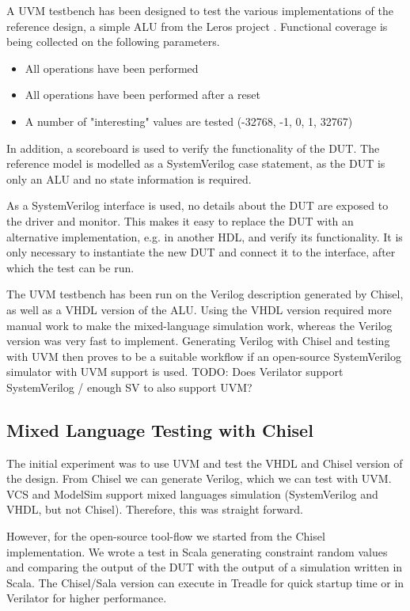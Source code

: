 \documentclass[conference]{IEEEtran}
\newcommand{\todo}[1]{{\color{olive} TODO: #1}}
\begin{document}
A UVM testbench has been designed to test the various implementations of the reference design, a simple ALU from the Leros project \cite{leros:fpl2011}. Functional coverage is being collected on the following parameters.
\begin{itemize}
    \item All operations have been performed
    \item All operations have been performed after a reset
    \item A number of "interesting" values are tested (-32768, -1, 0, 1, 32767)
\end{itemize}

In addition, a scoreboard is used to verify the functionality of the DUT. The reference model is modelled as a SystemVerilog case statement, as the DUT is only an ALU and no state information is required.

As a SystemVerilog interface is used, no details about the DUT are exposed to the driver and monitor. This makes it easy to replace the DUT with an alternative implementation, e.g. in another HDL, and verify its functionality. It is only necessary to instantiate the new DUT and connect it to the interface, after which the test can be run.

The UVM testbench has been run on the Verilog description generated by Chisel, as well as a VHDL version of the ALU. Using the VHDL version required more manual work to make the mixed-language simulation work, whereas the Verilog version was very fast to implement. Generating Verilog with Chisel and testing with UVM then proves to be a suitable workflow if an open-source SystemVerilog simulator with UVM support is used. \todo{Does Verilator support SystemVerilog / enough SV to also support UVM?}


\subsection{Mixed Language Testing with Chisel}


The initial experiment was to use UVM and test the VHDL and Chisel version of the
design. From Chisel we can generate Verilog, which we can test with UVM.
VCS and ModelSim support mixed languages simulation (SystemVerilog and VHDL,
but not Chisel). Therefore, this was straight forward.

However, for the open-source tool-flow we started from the Chisel implementation.
We wrote a test in Scala generating constraint random values and comparing the output
of the DUT with the output of a simulation written in Scala.
The Chisel/Sala version can execute in Treadle for  quick startup time or in Verilator
for higher performance.
\end{document}
